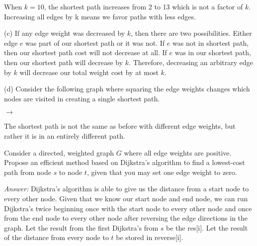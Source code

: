 \documentclass[12pt]{article}
\newenvironment{problem}[2][Problem]{\begin{trivlist}
\item[\hskip \labelsep {\bfseries #1}\hskip \labelsep {\bfseries #2.}]}{\end{trivlist}}
\begin{document}
When $k=10$, the shortest path increases from 2 to 13 which is not a factor of $k$. Increasing all edges by k means we favor paths with less edges.

(c) If any edge weight was decreased by $k$, then there are two possibilities. Either edge $e$ was part of our shortest path or it was not. If $e$ was not in shortest path, then our shortest path cost will not decrease at all. If $e$ was in our shortest path, then our shortest path will decrease by $k$. Therefore, decreasing an arbitrary edge by $k$ will decrease our total weight cost by at most $k$.

(d) Consider the following graph where squaring the edge weights changes which nodes are visited in creating a single shortest path.

$\rightarrow$

The shortest path is not the same as before with different edge weights, but rather it is in an entirely different path.
\begin{problem}{5}
    Consider a directed, weighted graph $G$ where all edge weights are positive. Propose an efficient method based on Dijkstra's algorithm to find a lowest-cost path from node $s$ to node $t$, given that you may set one edge weight to zero.
\end{problem}
\textit{Answer:} Dijkstra's algorithm is able to give us the distance from a start node to every other node. Given that we know our start node and end node, we can run Dijkstra's twice beginning once with the start node to every other node and once from the end node to every other node after reversing the edge directions in the graph. Let the result from the first Dijkstra's from $s$ be the res[i]. Let the result of the distance from every node to $t$ be stored in reverse[i].
\end{document}
